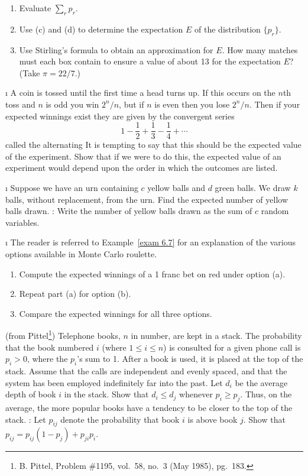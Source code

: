 \begin{LJSItem}
\begin{enumerate}
\item Evaluate $\sum_r p_r$.

\item Use (c) and (d) to determine the expectation $E$ of the distribution
$\{p_r\}$.

\item Use Stirling's formula to obtain an approximation for $E$.  How many matches
must each box contain to ensure a value of about 13 for the expectation
$E$?  (Take $\pi = 22/7$.)
\end{enumerate}

\i\label{exer 6.1.35} A coin is tossed until the first time a head turns up.  If
this occurs on the $n$th toss and $n$ is odd you win $2^n/n$, but if $n$ is even
then you lose
$2^n/n$.  Then if your expected winnings exist they are given by the convergent series
$$ 1 - \frac 12 + \frac 13 - \frac 14 +\cdots
$$ called the alternating    It is tempting to say that this
should be the expected value of the experiment.  Show that if we were to do this, the
expected value of an experiment would depend upon the order in which the outcomes are
listed.

\i\label{exer 6.1.37} Suppose we have an urn containing $c$
yellow balls and $d$ green balls.  We draw $k$ balls, without replacement,
from the urn.  Find the expected number of yellow balls drawn.  :  Write the
number of yellow balls drawn as the sum of $c$ random variables.

\i\label{exer 6.1.38} The reader is referred to Example~\ref{exam 6.7} for an explanation
of the various options available in Monte Carlo roulette.
\begin{enumerate}
\item Compute the expected winnings of a 1 franc bet on red under option (a).
\item Repeat part (a) for option (b).
\item Compare the expected winnings for all three options.  
\end{enumerate}

\istar\label{exer 6.1.39}
(from Pittel\footnote{B. Pittel, Problem \#1195,  vol.~58,
no.\ 3 (May 1985), pg.~183.}) Telephone books, $n$ in
number, are kept in a stack.  The probability that the book numbered $i$ (where $1 \le i \le
n$) is consulted for a given phone call is $p_i > 0$, where the $p_i$'s sum to 1.  After a
book is used, it is placed at the top of the stack.  Assume that the calls are independent
and evenly spaced, and that the system has been employed indefinitely far into the past.  Let
$d_i$ be the average depth of book $i$ in the stack.  Show that $d_i \le d_j$ whenever $p_i
\ge p_j$.  Thus, on the average, the more popular books have a tendency to be closer to the
top of the stack. :  Let $p_{ij}$ denote the probability that book $i$ is above
book $j$.  Show that $p_{ij} = p_{ij}(1 - p_j) + p_{ji}p_i$.


\end{LJSItem}
